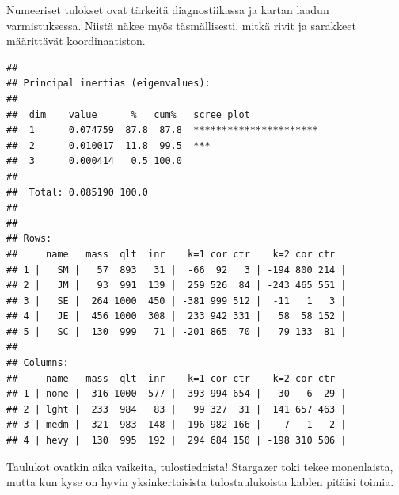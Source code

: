 \documentclass[finnish,]{book}
\newenvironment{Shaded}{\begin{snugshade}}{\end{snugshade}}
\newcommand{\CommentTok}[1]{\textcolor[rgb]{0.56,0.35,0.01}{\textit{#1}}}
\newcommand{\KeywordTok}[1]{\textcolor[rgb]{0.13,0.29,0.53}{\textbf{#1}}}
\newcommand{\NormalTok}[1]{#1}
\newcommand{\StringTok}[1]{\textcolor[rgb]{0.31,0.60,0.02}{#1}}
\begin{document}
Numeeriset tulokset ovat tärkeitä diagnostiikassa ja kartan laadun varmistuksessa. Niistä näkee myös täsmällisesti, mitkä rivit ja sarakkeet määrittävät koordinaatiston.

\begin{Shaded}
\end{Shaded}

\begin{verbatim}
## 
## Principal inertias (eigenvalues):
## 
##  dim    value      %   cum%   scree plot               
##  1      0.074759  87.8  87.8  **********************   
##  2      0.010017  11.8  99.5  ***                      
##  3      0.000414   0.5 100.0                           
##         -------- -----                                 
##  Total: 0.085190 100.0                                 
## 
## 
## Rows:
##     name   mass  qlt  inr    k=1 cor ctr    k=2 cor ctr  
## 1 |   SM |   57  893   31 |  -66  92   3 | -194 800 214 |
## 2 |   JM |   93  991  139 |  259 526  84 | -243 465 551 |
## 3 |   SE |  264 1000  450 | -381 999 512 |  -11   1   3 |
## 4 |   JE |  456 1000  308 |  233 942 331 |   58  58 152 |
## 5 |   SC |  130  999   71 | -201 865  70 |   79 133  81 |
## 
## Columns:
##     name   mass  qlt  inr    k=1 cor ctr    k=2 cor ctr  
## 1 | none |  316 1000  577 | -393 994 654 |  -30   6  29 |
## 2 | lght |  233  984   83 |   99 327  31 |  141 657 463 |
## 3 | medm |  321  983  148 |  196 982 166 |    7   1   2 |
## 4 | hevy |  130  995  192 |  294 684 150 | -198 310 506 |
\end{verbatim}

Taulukot ovatkin aika vaikeita, tulostiedoista! Stargazer toki tekee monenlaista, mutta kun kyse on hyvin yksinkertaisista tulostaulukoista kablen pitäisi toimia.
\end{document}
